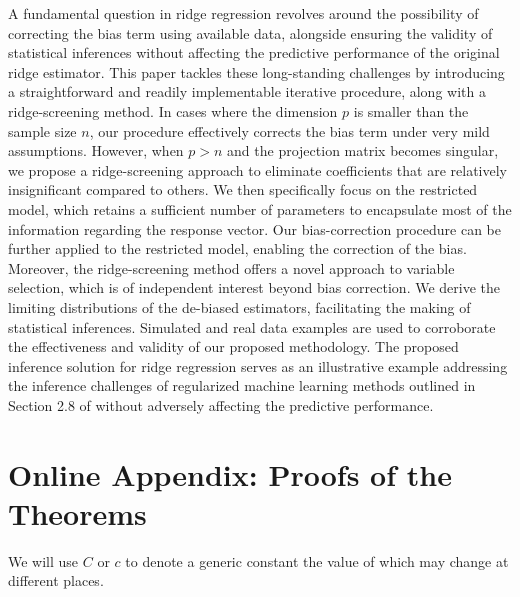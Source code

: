 {{   A fundamental question in ridge regression revolves around the possibility of correcting the bias term using available data, alongside ensuring the validity of statistical inferences without affecting the predictive performance of the original ridge estimator. This paper tackles these long-standing challenges by introducing a straightforward and readily implementable iterative procedure, along with a ridge-screening method. In cases where the dimension $p$ is smaller than the sample size $n$, our procedure effectively corrects the bias term under very mild assumptions. However, when $p>n$ and the projection matrix becomes singular, we propose a ridge-screening approach to eliminate coefficients that are relatively insignificant compared to others. We then specifically focus on the restricted model, which retains a sufficient number of parameters to encapsulate most of the information regarding the response vector. Our bias-correction procedure can be further applied to the restricted model, enabling the correction of the bias. Moreover, the ridge-screening method offers a novel approach to variable selection, which is of independent interest beyond bias correction. We derive the limiting distributions of the de-biased estimators, facilitating the making of statistical inferences. Simulated  and real data examples are used to corroborate the effectiveness and validity of our proposed methodology. The proposed inference solution for ridge regression serves as an illustrative example addressing the inference challenges of regularized machine learning methods outlined in Section 2.8 of \cite{athey2019machine}  without adversely affecting the predictive performance.  



		
		
	
	
	
		\singlespacing

\let\oldbibliography\thebibliography
\renewcommand{\thebibliography}[1]{  \oldbibliography{#1}  \setlength{\itemsep}{3pt}}
	{\footnotesize
		
	}

 \onehalfspacing

\newpage
\setcounter{page}{1}
\appendix
\restoregeometry

 \setcounter{equation}{0}
	\renewcommand{\theequation}{A.\arabic{equation}}
  \section*{Online Appendix: Proofs of the Theorems}\label{sec5}
\onehalfspacing We will use $C$ or $c$ to denote a generic constant the value of which may change at different places.
\vskip 0.5cm

}}
